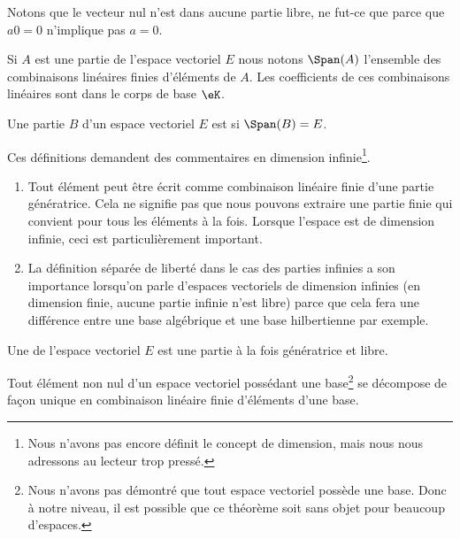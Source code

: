 \begin{remark}
    Notons que le vecteur nul n'est dans aucune partie libre, ne fut-ce que parce que \( a0=0\) n'implique pas \( a=0\).
\end{remark}

Si \( A\) est une partie de l'espace vectoriel \( E\) nous notons \( \Span(A)\) l'ensemble des combinaisons linéaires finies d'éléments de \( A\). Les coefficients de ces combinaisons linéaires sont dans le corps de base \( \eK\).

\begin{definition}
    Une partie $B$ d'un espace vectoriel \( E\) est  si \( \Span(B)=E\).
\end{definition}

\begin{remark}
    Ces définitions demandent des commentaires en dimension infinie\footnote{Nous n'avons pas encore définit le concept de dimension, mais nous nous adressons au lecteur trop pressé.}.

    \begin{enumerate}
        \item
    Tout élément peut être écrit comme combinaison linéaire finie d'une partie génératrice. Cela ne signifie pas que nous pouvons extraire une partie finie qui convient pour tous les éléments à la fois. Lorsque l'espace est de dimension infinie, ceci est particulièrement important.
\item
    La définition séparée de liberté dans le cas des parties infinies a son importance lorsqu'on parle d'espaces vectoriels de dimension infinies (en dimension finie, aucune partie infinie n'est libre) parce que cela fera une différence entre une base algébrique et une base hilbertienne par exemple.
    \end{enumerate}
\end{remark}

\begin{definition}[Base]
    Une  de l'espace vectoriel \( E\) est une partie à la fois génératrice et libre.
\end{definition}

\begin{proposition}      \label{PROPooEIQIooXfWDDV}
    Tout élément non nul d'un espace vectoriel possédant une base\footnote{Nous n'avons pas démontré que tout espace vectoriel possède une base. Donc à notre niveau, il est possible que ce théorème soit sans objet pour beaucoup d'espaces.} se décompose de façon unique en combinaison linéaire finie d'éléments d'une base.
\end{proposition}

